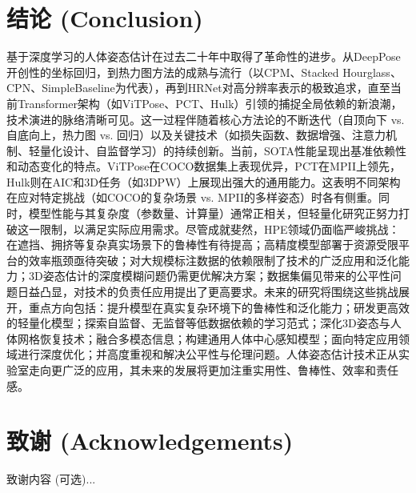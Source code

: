 \documentclass[12pt,a4paper]{article}
\begin{document}
\section{结论 (Conclusion)}
基于深度学习的人体姿态估计在过去二十年中取得了革命性的进步。从DeepPose开创性的坐标回归，到热力图方法的成熟与流行（以CPM、Stacked Hourglass、CPN、SimpleBaseline为代表），再到HRNet对高分辨率表示的极致追求，直至当前Transformer架构（如ViTPose、PCT、Hulk）引领的捕捉全局依赖的新浪潮，技术演进的脉络清晰可见。这一过程伴随着核心方法论的不断迭代（自顶向下 vs. 自底向上，热力图 vs. 回归）以及关键技术（如损失函数、数据增强、注意力机制、轻量化设计、自监督学习）的持续创新。当前，SOTA性能呈现出基准依赖性和动态变化的特点。ViTPose在COCO数据集上表现优异，PCT在MPII上领先，Hulk则在AIC和3D任务（如3DPW）上展现出强大的通用能力。这表明不同架构在应对特定挑战（如COCO的复杂场景 vs. MPII的多样姿态）时各有侧重。同时，模型性能与其复杂度（参数量、计算量）通常正相关，但轻量化研究正努力打破这一限制，以满足实际应用需求。尽管成就斐然，HPE领域仍面临严峻挑战：在遮挡、拥挤等复杂真实场景下的鲁棒性有待提高；高精度模型部署于资源受限平台的效率瓶颈亟待突破；对大规模标注数据的依赖限制了技术的广泛应用和泛化能力；3D姿态估计的深度模糊问题仍需更优解决方案；数据集偏见带来的公平性问题日益凸显，对技术的负责任应用提出了更高要求。未来的研究将围绕这些挑战展开，重点方向包括：提升模型在真实复杂环境下的鲁棒性和泛化能力；研发更高效的轻量化模型；探索自监督、无监督等低数据依赖的学习范式；深化3D姿态与人体网格恢复技术；融合多模态信息；构建通用人体中心感知模型；面向特定应用领域进行深度优化；并高度重视和解决公平性与伦理问题。人体姿态估计技术正从实验室走向更广泛的应用，其未来的发展将更加注重实用性、鲁棒性、效率和责任感。

\section*{致谢 (Acknowledgements)} %
致谢内容 (可选)...

\printbibliography %
\end{document}
